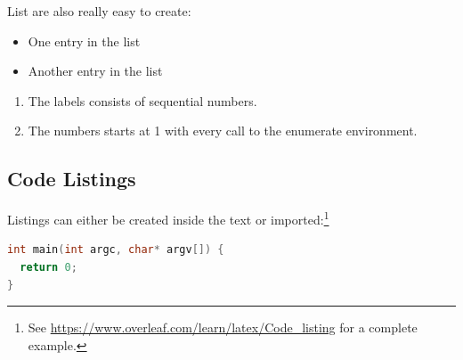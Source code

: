 List are also really easy to create:

\begin{itemize}
  \item One entry in the list
  \item Another entry in the list
\end{itemize}

\begin{enumerate}
  \item The labels consists of sequential numbers.
  \item The numbers starts at 1 with every call to the enumerate environment.
\end{enumerate}

\subsection{Code Listings}
\label{sec:intro:sub:code}

Listings can either be created inside the text or imported:\footnote{See \url{https://www.overleaf.com/learn/latex/Code_listing} for a complete example.}
\begin{lstlisting}[language=C]
int main(int argc, char* argv[]) {
  return 0;
}
\end{lstlisting}